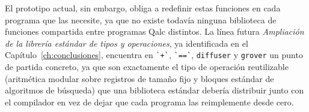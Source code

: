 El prototipo actual, sin embargo, obliga a redefinir estas funciones en cada programa que las necesite, ya que no existe todavía ninguna biblioteca de funciones compartida entre programas Qalc distintos. La línea futura \textit{Ampliación de la librería estándar de tipos y operaciones}, ya identificada en el Capítulo~\ref{ch:conclusiones}, encuentra en \lstinline|`+`|, \lstinline|`==`|, \lstinline|diffuser| y \lstinline|grover| un punto de partida concreto, ya que son exactamente el tipo de operación reutilizable (aritmética modular sobre registros de tamaño fijo y bloques estándar de algoritmos de búsqueda) que una biblioteca estándar debería distribuir junto con el compilador en vez de dejar que cada programa las reimplemente desde cero.
